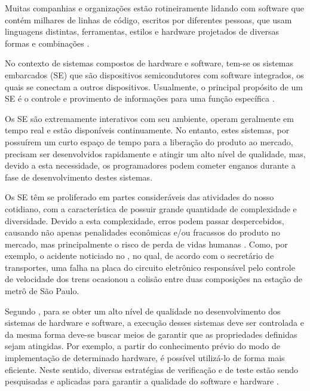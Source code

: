 Muitas companhias e organizações estão rotineiramente lidando com software que contém milhares de linhas de código, escritos por diferentes pessoas, que usam linguagens distintas, ferramentas, estilos e hardware projetados de diversas formas e combinações \cite{hoder2011case}. 

\par
No contexto de sistemas compostos de hardware e software, tem-se os sistemas embarcados (SE) que são dispositivos semicondutores com software integrados, os quais se conectam a outros dispositivos. Usualmente, o principal propósito de um SE é o controle e provimento de informações para uma função específica \cite{ramesh2012energy}. 

\par
Os SE são extremamente interativos com seu ambiente, operam geralmente em tempo real e estão disponíveis continuamente. No entanto, estes sistemas, por possuírem um curto espaço de tempo para a liberação do produto ao mercado, precisam ser desenvolvidos rapidamente e atingir um alto nível de qualidade, mas, devido a esta necessidade, os programadores podem cometer enganos durante a fase de desenvolvimento destes sistemas.

\par
Os SE têm se proliferado em partes consideráveis das atividades do nosso cotidiano, com a característica de possuir grande quantidade de complexidade e diversidade. Devido a esta complexidade, erros podem passar despercebidos, causando não apenas penalidades econômicas e/ou fracassos do produto no mercado, mas principalmente o risco de perda de vidas humanas \cite{cabodi2016hardware}. Como, por exemplo, o acidente noticiado no \cite{g1Acidente}, no qual, de acordo com o secretário de transportes, uma falha na placa do circuito eletrônico responsável pelo controle de velocidade dos trens ocasionou a colisão entre duas composições na estação de metrô de São Paulo.

\par
Segundo \citeauthor{rocha2015verificaccao}\citeyear{rocha2015verificaccao}, para se obter um alto nível de qualidade no desenvolvimento dos sistemas de hardware e software, a execução desses sistemas deve ser controlada e da mesma forma deve-se buscar meios de garantir que as propriedades definidas sejam atingidas. Por exemplo, a partir do conhecimento prévio do modo de implementação de determinado hardware, é possível utilizá-lo de forma mais eficiente. Neste sentido, diversas estratégias de verificação e de teste estão sendo pesquisadas e aplicadas para garantir a qualidade do software e hardware \cite{hoder2010interpolation,rocha2010exploiting,brayton2010abc,cordeiro2012smt,cabodi2016hardware}.

